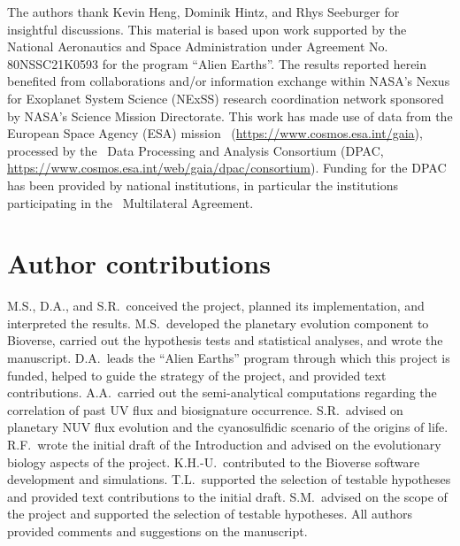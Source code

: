 \begin{acknowledgments}
    The authors thank Kevin Heng, Dominik Hintz, and Rhys Seeburger for insightful discussions.
    This material is based upon work supported by the National Aeronautics and Space Administration under Agreement No. 80NSSC21K0593 for the program ``Alien Earths''.
    The results reported herein benefited from collaborations and/or information exchange within NASA’s Nexus for Exoplanet System Science (NExSS) research coordination network sponsored by NASA’s Science Mission Directorate.
    This work has made use of data from the European Space Agency (ESA) mission \gaia\ (\url{https://www.cosmos.esa.int/gaia}), processed by the \gaia\ Data Processing and Analysis Consortium (DPAC, \url{https://www.cosmos.esa.int/web/gaia/dpac/consortium}). Funding for the DPAC has been provided by national institutions, in particular the institutions participating in the \gaia\ Multilateral Agreement.
\end{acknowledgments}

\section*{Author contributions}
M.S., D.A., and S.R.\ conceived the project, planned its implementation, and interpreted the results.
M.S.\ developed the planetary evolution component to Bioverse, carried out the hypothesis tests and statistical analyses, and wrote the manuscript.
D.A.\ leads the ``Alien Earths'' program through which this project is funded, helped to guide the strategy of the project, and provided text contributions.
A.A.\ carried out the semi-analytical computations regarding the correlation of past UV flux and biosignature occurrence.
S.R.\ advised on planetary \gls{NUV} flux evolution and the cyanosulfidic scenario of the origins of life.
R.F.\ wrote the initial draft of the Introduction and advised on the evolutionary biology aspects of the project.
K.H.-U.\ contributed to the Bioverse software development and simulations.
T.L.\ supported the selection of testable hypotheses and provided text contributions to the initial draft.
S.M.\ advised on the scope of the project and supported the selection of testable hypotheses.
All authors provided comments and suggestions on the manuscript.


